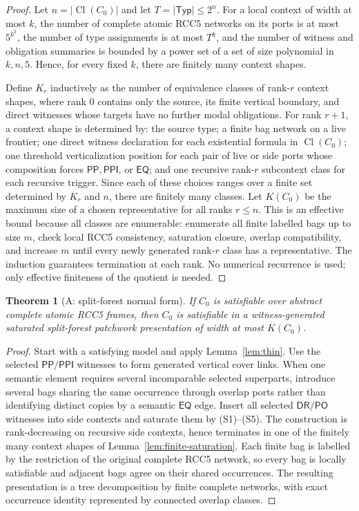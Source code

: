 \documentclass[11pt]{article}
\newtheorem{theorem}{Theorem}[section]
\newcommand{\EQ}{\mathsf{EQ}}
\newcommand{\PP}{\mathsf{PP}}
\newcommand{\PPI}{\mathsf{PPI}}
\newcommand{\PO}{\mathsf{PO}}
\newcommand{\DR}{\mathsf{DR}}
\newcommand{\Cl}{\operatorname{Cl}}
\begin{document}
\begin{proof}
Let $n=|\Cl(C_0)|$ and let $T=|\mathsf{Typ}|\le 2^n$.  For a local context of width at
most $k$, the number of complete atomic RCC5 networks on its ports is at most
$5^{k^2}$, the number of type assignments is at most $T^k$, and the number of witness
and obligation summaries is bounded by a power set of a set of size polynomial in
$k,n,5$.  Hence, for every fixed $k$, there are finitely many context shapes.

Define $K_r$ inductively as the number of equivalence classes of rank-$r$ context shapes,
where rank $0$ contains only the source, its finite vertical boundary, and direct
witnesses whose targets have no further modal obligations.  For rank $r+1$, a context
shape is determined by: the source type; a finite bag network on a live frontier; one
direct witness declaration for each existential formula in $\Cl(C_0)$; one threshold
verticalization position for each pair of live or side ports whose composition forces
$\PP,\PPI$, or $\EQ$; and one recursive rank-$r$ subcontext class for each recursive
trigger.  Since each of these choices ranges over a finite set determined by $K_r$ and
$n$, there are finitely many classes.  Let $K(C_0)$ be the maximum size of a chosen
representative for all ranks $r\le n$.  This is an effective bound because all classes are
enumerable: enumerate all finite labelled bags up to size $m$, check local RCC5
consistency, saturation closure, overlap compatibility, and increase $m$ until every
newly generated rank-$r$ class has a representative.  The induction guarantees
termination at each rank.  No numerical recurrence is used; only effective finiteness of
the quotient is needed.
\end{proof}

\begin{theorem}[A: split-forest normal form]\label{thm:A}
If $C_0$ is satisfiable over abstract complete atomic RCC5 frames, then $C_0$ is
satisfiable in a witness-generated saturated split-forest patchwork presentation of width
at most $K(C_0)$.
\end{theorem}

\begin{proof}
Start with a satisfying model and apply Lemma~\ref{lem:thin}.  Use the selected
$\PP/\PPI$ witnesses to form generated vertical cover links.  When one semantic element
requires several incomparable selected superparts, introduce several bags sharing the
same occurrence through overlap ports rather than identifying distinct copies by a
semantic $\EQ$ edge.  Insert all selected $\DR/\PO$ witnesses into side contexts and
saturate them by (S1)--(S5).  The construction is rank-decreasing on recursive side
contexts, hence terminates in one of the finitely many context shapes of
Lemma~\ref{lem:finite-saturation}.  Each finite bag is labelled by the restriction of the
original complete RCC5 network, so every bag is locally satisfiable and adjacent bags
agree on their shared occurrences.  The resulting presentation is a tree decomposition by
finite complete networks, with exact occurrence identity represented by connected overlap
classes.
\end{proof}
\end{document}
